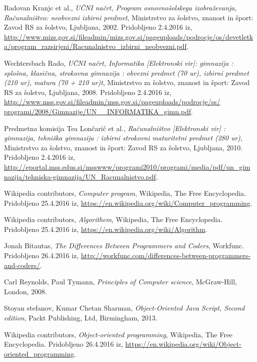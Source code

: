 \begin{thebibliography}{9}
 Radovan Kranjc et al., \emph{UČNI
    načrt, Program osnovnošolskega izobraževanja, Računalništvo:
    neobvezni izbirni predmet}, Ministrstvo za šolstvo, znanost in
  šport: Zavod RS za šolstvo, Ljubljana, 2002. Pridobljeno 2.4.2016
  iz,
  \url{http://www.mizs.gov.si/fileadmin/mizs.gov.si/pageuploads/podrocje/os/devetletka/program_razsirjeni/Racunalnistvo_izbirni_neobvezni.pdf}.

 Wechtersbach Rado, \emph{UČNI
    načrt, Informatika [Elektronski vir]: gimnazija : splošna,
    klasična, strokovna gimnazija : obvezni predmet (70 ur), izbirni
    predmet (210 ur), matura (70 + 210 ur)t}, Ministrstvo za šolstvo,
  znanost in šport: Zavod RS za šolstvo, Ljubljana, 2008. Pridobljeno
  2.4.2016 iz,
  \url{http://www.mss.gov.si/fileadmin/mss.gov.si/pageuploads/podrocje/ss/ programi/2008/Gimnazije/UN__INFORMATIKA_gimn.pdf}.

 Predmetna komisija Tea Lončarič et al.,
  \emph{Računalništvo [Elektronski vir] : gimnazija, tehniška
    gimnazija : izbirni strokovni maturitetni predmet (280 ur)},
  Ministrstvo za šolstvo, znanost in šport: Zavod RS za šolstvo,
  Ljubljana, 2010. Pridobljeno 2.4.2016 iz,
  \url{http://eportal.mss.edus.si/msswww/programi2010/programi/media/pdf/un_gimnazija/tehniska-gimnazija/UN_Racunalnistvo.pdf}.

 Wikipedia contributors, \emph{Computer
    program}, Wikipedia, The Free Encyclopedia. Pridobljeno 25.4.2016
  iz,
  \url{https://en.wikipedia.org/wiki/Computer_programming}.


 Wikipedia contributors, \emph{Algorithem},
  Wikipedia, The Free Encyclopedia. Pridobljeno 25.4.2016 iz,
  \url{https://en.wikipedia.org/wiki/Algorithm}.

 Jonah Bitautas, \emph{The Differences Between
    Programmers and Coders}, Workfunc. Pridobljeno 26.4.2016 iz,
  \url{http://workfunc.com/differences-between-programmers-and-coders/}.

 Carl Reynolds, Paul Tymann, \emph{Principles of Computer science},
  McGraw-Hill, London, 2008.

 Stoyan stefanov, Kumar Chetan Sharman, \emph{Object-Oriented Java Script,
    Second edition}, Packt Publishing, Ltd, Birmingham, 2013.

 Wikipedia contributors, \emph{Object-oriented
    programming}, Wikipedia, The Free Encyclopedia. Pridobljeno
  26.4.2016 iz,
  \url{https://en.wikipedia.org/wiki/Object-oriented_programming}.


\end{thebibliography}
